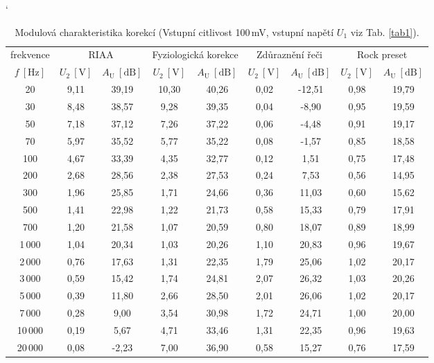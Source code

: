 \documentclass[a4paper, czech]{article}
\begin{document}
\begin{table}[H]
\centering
\catcode`
\caption{Modulová charakteristika korekcí (Vstupní citlivost 100\,mV, vstupní napětí $U_1$ viz Tab. \ref{tab1}).}
    \begin{tabular}{ccccccccc}
        \toprule
        frekvence  & \multicolumn{2}{c}{RIAA} & \multicolumn{2}{c}{Fyziologická korekce} & \multicolumn{2}{c}{Zdůraznění řeči} & \multicolumn{2}{c}{Rock preset} \\
        \cmidrule(rl){1-1}
        \cmidrule(rl){2-3}
        \cmidrule(rl){4-5}
        \cmidrule(rl){6-7}
        \cmidrule(rl){8-9}
        $f\ [\mathrm{Hz}]$ & $U_2\ [\mathrm{V}]$ & $A_\mathrm{U}\ [\mathrm{dB}]$ & $U_2\ [\mathrm{V}]$ & $A_\mathrm{U}\ [\mathrm{dB}]$ & $U_2\ [\mathrm{V}]$ & $A_\mathrm{U}\ [\mathrm{dB}]$ & $U_2\ [\mathrm{V}]$ & $A_\mathrm{U}\ [\mathrm{dB}]$ \\
        \midrule
        20    & 9,11 & 39,19 & 10,30 & 40,26 & 0,02 & -12,51 & 0,98 & 19,79 \\
        30    & 8,48 & 38,57 & 9,28  & 39,35 & 0,04 & -8,90  & 0,95 & 19,59 \\
        50    & 7,18 & 37,12 & 7,26  & 37,22 & 0,06 & -4,48  & 0,91 & 19,17 \\
        70    & 5,97 & 35,52 & 5,77  & 35,22 & 0,08 & -1,57  & 0,85 & 18,58 \\
        100   & 4,67 & 33,39 & 4,35  & 32,77 & 0,12 & 1,51   & 0,75 & 17,48 \\
        200   & 2,68 & 28,56 & 2,38  & 27,53 & 0,24 & 7,53   & 0,56 & 14,95 \\
        300   & 1,96 & 25,85 & 1,71  & 24,66 & 0,36 & 11,03  & 0,60 & 15,62 \\
        500   & 1,41 & 22,98 & 1,22  & 21,73 & 0,58 & 15,33  & 0,79 & 17,91 \\
        700   & 1,20 & 21,58 & 1,07  & 20,59 & 0,80 & 18,07  & 0,89 & 18,99 \\
        1\,000  & 1,04 & 20,34 & 1,03  & 20,26 & 1,10 & 20,83  & 0,96 & 19,67 \\
        2\,000  & 0,76 & 17,63 & 1,31  & 22,35 & 1,79 & 25,06  & 1,02 & 20,17 \\
        3\,000  & 0,59 & 15,42 & 1,74  & 24,81 & 2,07 & 26,32  & 1,03 & 20,26 \\
        5\,000  & 0,39 & 11,80 & 2,66  & 28,50 & 2,01 & 26,06  & 1,02 & 20,17 \\
        7\,000  & 0,28 & 9,00  & 3,54  & 30,98 & 1,72 & 24,71  & 1,00 & 20,00 \\
        10\,000 & 0,19 & 5,67  & 4,71  & 33,46 & 1,31 & 22,35  & 0,96 & 19,63 \\
        20\,000 & 0,08 & -2,23 & 7,00  & 36,90 & 0,58 & 15,27  & 0,76 & 17,59 \\
        \bottomrule
    \end{tabular}
\end{table}
\end{document}
